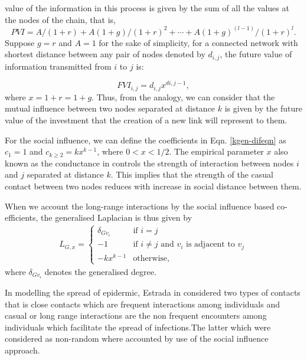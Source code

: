 \documentclass[10pt,a4paper]{article}
\begin{document}
\begin{enumerate}[1)]
    	    	value of the information in this process is given by the sum of all the values at the nodes of the chain, that is,
    	    	\begin{equation}
    	    	PVI
    	    	= A /( 1 + r ) + A ( 1 + g )/( 1 + r )^2 + \cdots + A ( 1 + g )^(l -1) /( 1 + r )^l .
    	    	\end{equation}
    	    	Suppose $g=r$ and $A=1$ for the sake of simplicity, for a connected network with shortest distance between any pair of nodes denoted by $d_{i,j}$, the future value of information transmitted from $i$ to $j$ is:
    	    	
    	    	\begin{equation}
    	    	FVI_{i,j} = d_{i,j} x^{d{i,j}-1},
    	    	\end{equation}
    	    	where $x = 1+r = 1+g$.
    	    	Thus, from the analogy, we can consider that the mutual influence between two nodes separated at distance $k$ is given by the future value of the investment that the creation of a new link will represent to them. 
    	    	
    	    	For the social influence, we can define the coefficients in Eqn. \ref{kgen-difeqn} as $c_1 =1 $ and $c_{k \geq 2} = k x^{k-1}$, where $0 < x < 1 / 2$. The empirical parameter $x$ also known as the conductance in \citep{estrada2011epidemic} controls the strength of interaction between nodes $i$ and $j$ separated at distance $k$. This implies that the strength of the casual contact  between two nodes reduces with increase in social distance between them.
    	    	
    	    	When we account the long-range interactions by the social influence based co-efficients, the generalised Laplacian is thus given by 
    	    	\begin{eqnarray}
    	    	L_{G,x} = \begin{cases} \delta_{Gv_i} &\mbox{if } i = j \\
    	    	-1 &\mbox{if } i \neq j \text{ and } v_i \text{ is adjacent to } v_j \\
    	    	-k x^{k-1} & \text{otherwise},
    	    	\end{cases}
    	    	\end{eqnarray}
    	    	where $\delta_{Gv_i}$ denotes the generalised degree.
    	    	
    	    	 In modelling the spread of epidermic, Estrada in \citep{estrada2011epidemic} considered two types of contacts that is   close contacts  which are frequent interactions among individuals and casual or long range interactions are the non frequent encounters among individuals which facilitate the spread of infections.The latter which were considered as non-random where accounted by use of the social influence approach.
    	    	 

\end{enumerate}
\end{document}
